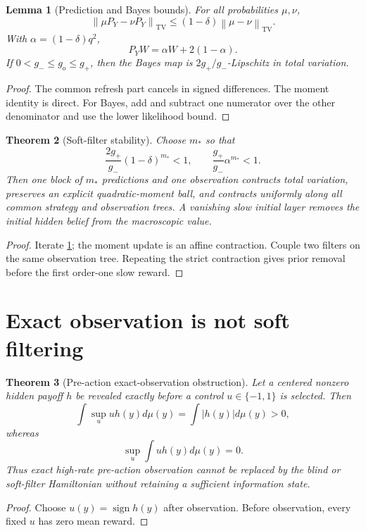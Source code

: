 \documentclass[11pt,reqno]{amsart}
\newtheorem{theorem}{Theorem}[section]
\newtheorem{lemma}[theorem]{Lemma}
\theoremstyle{definition}
\theoremstyle{remark}
\newcommand{\TV}{\mathrm{TV}}
\newcommand{\norm}[1]{\left\lVert #1\right\rVert}
\newcommand{\abs}[1]{\left\lvert #1\right\rvert}
\begin{document}
\begin{lemma}[Prediction and Bayes bounds]\label{lem:filter-bounds}
For all probabilities $\mu,\nu$,
\[
 \norm{\mu P_Y-\nu P_Y}_{\TV}
 \le(1-\delta)\norm{\mu-\nu}_{\TV}.
\]
With $\alpha=(1-\delta)q^2$,
\[
 P_YW=\alpha W+2(1-\alpha).
\]
If $0<g_-\le g_o\le g_+$, then the Bayes map is
$2g_+/g_-$-Lipschitz in total variation.
\end{lemma}
\begin{proof}
The common refresh part cancels in signed differences.  The moment identity is
direct.  For Bayes, add and subtract one numerator over the other denominator
and use the lower likelihood bound.
\end{proof}

\begin{theorem}[Soft-filter stability]\label{thm:filter}
Choose $m_*$ so that
\[
 \frac{2g_+}{g_-}(1-\delta)^{m_*}<1,
 \qquad
 \frac{g_+}{g_-}\alpha^{m_*}<1.
\]
Then one block of $m_*$ predictions and one observation contracts total
variation, preserves an explicit quadratic-moment ball, and contracts
uniformly along all common strategy and observation trees.  A vanishing slow
initial layer removes the initial hidden belief from the macroscopic value.
\end{theorem}
\begin{proof}
Iterate \cref{lem:filter-bounds}; the moment update is an affine contraction.
Couple two filters on the same observation tree.  Repeating the strict
contraction gives prior removal before the first order-one slow reward.
\end{proof}

\section{Exact observation is not soft filtering}\label{sec:no-go}
\begin{theorem}[Pre-action exact-observation obstruction]\label{thm:no-go}
Let a centered nonzero hidden payoff $h$ be revealed exactly before a control
$u\in\{-1,1\}$ is selected.  Then
\[
 \int\sup_u uh(y)d\mu(y)=\int\abs{h(y)}d\mu(y)>0,
\]
whereas
\[
 \sup_u\int uh(y)d\mu(y)=0.
\]
Thus exact high-rate pre-action observation cannot be replaced by the blind or
soft-filter Hamiltonian without retaining a sufficient information state.
\end{theorem}
\begin{proof}
Choose $u(y)=\operatorname{sign}h(y)$ after observation.  Before observation,
every fixed $u$ has zero mean reward.
\end{proof}
\end{document}
